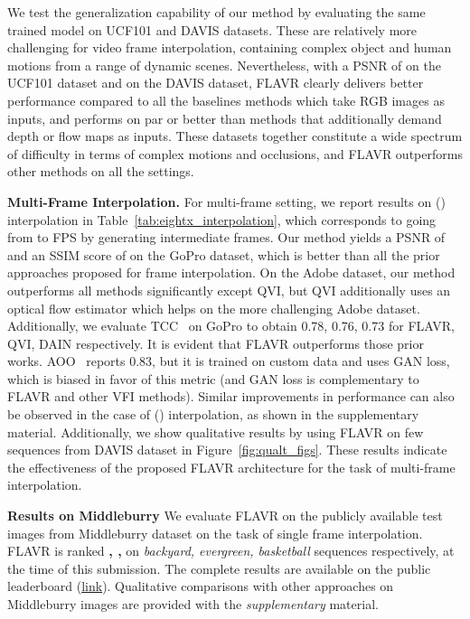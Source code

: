 \documentclass[10pt,twocolumn,letterpaper]{article}
\newcommand{\figref}[1]{Figure~\ref{#1}}
\newcommand{\tabref}[1]{Table~\ref{#1}}
\newcommand{\red}[1]{{#1}}
\newcommand{\Ours}{FLAVR}
\newcommand{\fourx}{}
\newcommand{\eightx}{}
\begin{document}
\begin{table*}[!t]
We test the generalization capability of our method by evaluating the same trained model on UCF101 and DAVIS datasets. These are relatively more challenging for video frame interpolation, containing complex object and human motions from a range of dynamic scenes. Nevertheless, with a PSNR of  on the UCF101 dataset and  on the DAVIS dataset, \Ours{} clearly delivers better performance compared to all the baselines methods which take RGB images as inputs, and performs on par or better than methods that additionally demand depth or flow maps as inputs. These datasets together constitute a wide spectrum of difficulty in terms of complex motions and occlusions, and \Ours{} outperforms other methods on all the settings. 

{\bf Multi-Frame Interpolation.} 
For multi-frame setting, we report results on \eightx{} () interpolation in \tabref{tab:eightx_interpolation}, which corresponds to going from  to  FPS by generating  intermediate frames. Our method yields a PSNR of  and an SSIM score of  on the GoPro dataset, which is better than all the prior approaches proposed for frame interpolation. On the Adobe dataset, our method outperforms all methods significantly except QVI, but QVI additionally uses an optical flow estimator which helps on the more challenging Adobe dataset. Additionally, we evaluate TCC~\cite{chi2020all} on GoPro to obtain {0.78, 0.76, 0.73} for {FLAVR, QVI, DAIN} respectively. It is evident that FLAVR outperforms those prior works. AOO~\cite{chi2020all} reports 0.83, but it is trained on custom data and uses GAN loss, which is biased in favor of this metric (and GAN loss is complementary to FLAVR and other VFI methods).
Similar improvements in performance can also be observed in the case of \fourx{} () interpolation, as shown in the \red{supplementary material}. Additionally, we show qualitative results by using \Ours{} on few sequences from DAVIS dataset in \figref{fig:qualt_figs}. 
These results indicate the effectiveness of the proposed \Ours{} architecture for the task of multi-frame interpolation.

\red{ {\bf Results on Middleburry} We evaluate FLAVR on the publicly available test images from Middleburry \cite{baker2011database,scharstein2014high} dataset on the task of single frame interpolation. \Ours{} is ranked {\bf \nth{2}, \nth{5}, \nth{8}} on {\em backyard, evergreen, basketball} sequences respectively, at the time of this submission. The complete results are available on the public leaderboard (\href{https://vision.middlebury.edu/flow/eval/results/results-i1.php}{link}). 
Qualitative comparisons with other approaches on Middleburry images are provided with the \emph{supplementary} material.}


\end{table*}
\end{document}
